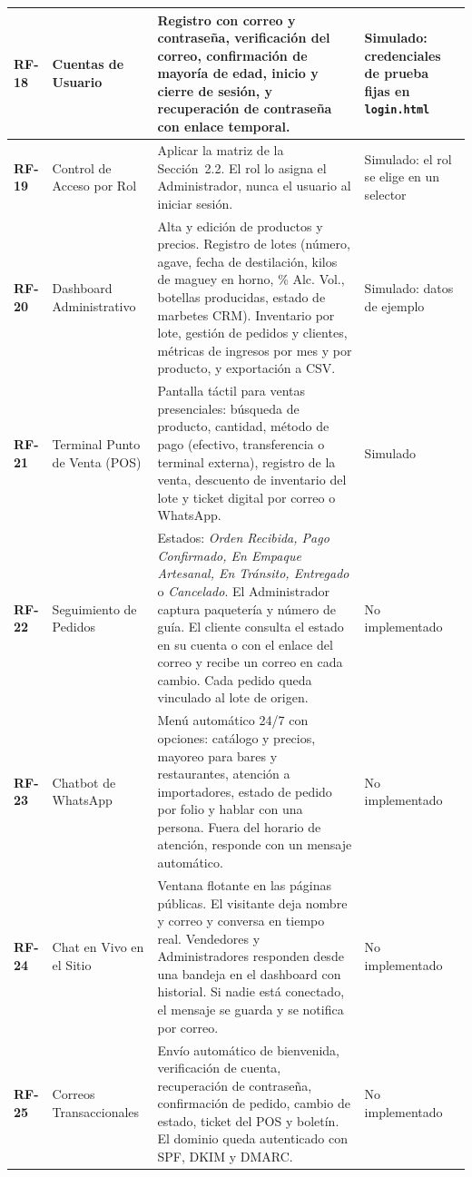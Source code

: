 \documentclass[11pt,letterpaper]{article}
\begin{document}
\begin{longtable}{@{} L{1.2cm} L{3.0cm} L{7.4cm} L{3.9cm} @{}}
\midrule
\textbf{RF-18} & Cuentas de Usuario & Registro con correo y contraseña, verificación del correo, confirmación de mayoría de edad, inicio y cierre de sesión, y recuperación de contraseña con enlace temporal. & Simulado: credenciales de prueba fijas en \texttt{login.html} \\
\midrule
\textbf{RF-19} & Control de Acceso por Rol & Aplicar la matriz de la Sección~2.2. El rol lo asigna el Administrador, nunca el usuario al iniciar sesión. & Simulado: el rol se elige en un selector \\
\midrule
\textbf{RF-20} & Dashboard Administrativo & Alta y edición de productos y precios. Registro de lotes (número, agave, fecha de destilación, kilos de maguey en horno, \% Alc. Vol., botellas producidas, estado de marbetes CRM). Inventario por lote, gestión de pedidos y clientes, métricas de ingresos por mes y por producto, y exportación a CSV. & Simulado: datos de ejemplo \\
\midrule
\textbf{RF-21} & Terminal Punto de Venta (POS) & Pantalla táctil para ventas presenciales: búsqueda de producto, cantidad, método de pago (efectivo, transferencia o terminal externa), registro de la venta, descuento de inventario del lote y ticket digital por correo o WhatsApp. & Simulado \\
\midrule
\textbf{RF-22} & Seguimiento de Pedidos & Estados: \textit{Orden Recibida, Pago Confirmado, En Empaque Artesanal, En Tránsito, Entregado} o \textit{Cancelado}. El Administrador captura paquetería y número de guía. El cliente consulta el estado en su cuenta o con el enlace del correo y recibe un correo en cada cambio. Cada pedido queda vinculado al lote de origen. & No implementado \\
\midrule
\textbf{RF-23} & Chatbot de WhatsApp & Menú automático 24/7 con opciones: catálogo y precios, mayoreo para bares y restaurantes, atención a importadores, estado de pedido por folio y hablar con una persona. Fuera del horario de atención, responde con un mensaje automático. & No implementado \\
\midrule
\textbf{RF-24} & Chat en Vivo en el Sitio & Ventana flotante en las páginas públicas. El visitante deja nombre y correo y conversa en tiempo real. Vendedores y Administradores responden desde una bandeja en el dashboard con historial. Si nadie está conectado, el mensaje se guarda y se notifica por correo. & No implementado \\
\midrule
\textbf{RF-25} & Correos Transaccionales & Envío automático de bienvenida, verificación de cuenta, recuperación de contraseña, confirmación de pedido, cambio de estado, ticket del POS y boletín. El dominio queda autenticado con SPF, DKIM y DMARC. & No implementado \\
\end{longtable}
\normalsize
\end{document}
